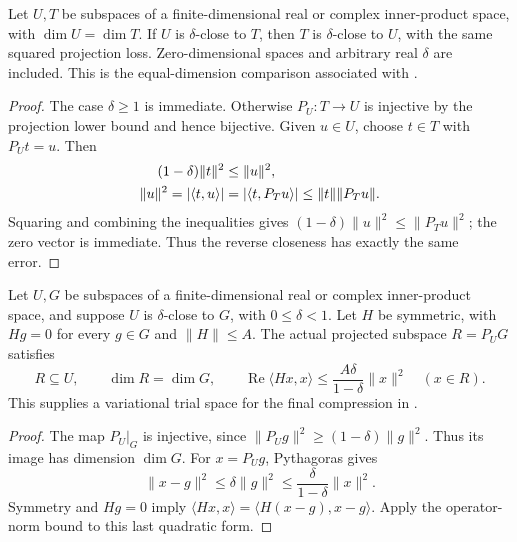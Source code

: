 \begin{lemma}
    \label{lem:subspace_close_equal_dimension_symmetry}
    \leanok
    Let $U,T$ be subspaces of a finite-dimensional real or complex
    inner-product space, with $\dim U=\dim T$. If $U$ is $\delta$-close
    to $T$, then $T$ is $\delta$-close to $U$, with the same squared
    projection loss. Zero-dimensional spaces and arbitrary real $\delta$
    are included. This is the equal-dimension comparison associated with
    \cite[Definition of closeness, lines 469--474]{Arad2016RigorousRG}.
\end{lemma}
\begin{proof}\leanok
    The case $\delta\ge1$ is immediate. Otherwise $P_U:T\to U$ is
    injective by the projection lower bound and hence bijective.
    Given $u\in U$, choose $t\in T$ with $P_Ut=u$. Then
    \begin{align}
        (1-\delta)\|t\|^2 & \le\|u\|^2,\notag                         \\
        \|u\|^2=|\langle t,u\rangle|
                          & =|\langle t,P_Tu\rangle|\le\|t\|\|P_Tu\|.
    \end{align}
    Squaring and combining the inequalities gives
    $(1-\delta)\|u\|^2\le\|P_Tu\|^2$; the zero vector is immediate.
    Thus the reverse closeness has exactly the same error.
\end{proof}

\begin{lemma}
    \label{lem:projected_trial_space_energy}
    \leanok
    Let $U,G$ be subspaces of a finite-dimensional real or complex inner-product
    space, and suppose $U$ is $\delta$-close to $G$, with $0\le\delta<1$.
    Let $H$ be symmetric, with $Hg=0$ for every $g\in G$ and $\lVert H\rVert\le A$.
    The actual projected subspace $R=P_U G$ satisfies
    \[
        R\subseteq U,\qquad \dim R=\dim G,\qquad
        \operatorname{Re}\langle Hx,x\rangle
        \le\frac{A\delta}{1-\delta}\lVert x\rVert^2\quad(x\in R).
    \]
    This supplies a variational trial space for the final compression in
    \cite[the proof of Theorem~\texttt{t:alg1}, lines 1811--1815]{Arad2016RigorousRG}.
\end{lemma}
\begin{proof}\leanok
    The map $P_U|_G$ is injective, since
    $\lVert P_Ug\rVert^2\ge(1-\delta)\lVert g\rVert^2$.
    Thus its image has dimension $\dim G$. For $x=P_Ug$, Pythagoras gives
    \[
        \lVert x-g\rVert^2\le\delta\lVert g\rVert^2
        \le\frac{\delta}{1-\delta}\lVert x\rVert^2.
    \]
    Symmetry and $Hg=0$ imply
    $\langle Hx,x\rangle=\langle H(x-g),x-g\rangle$.
    Apply the operator-norm bound to this last quadratic form.
\end{proof}


